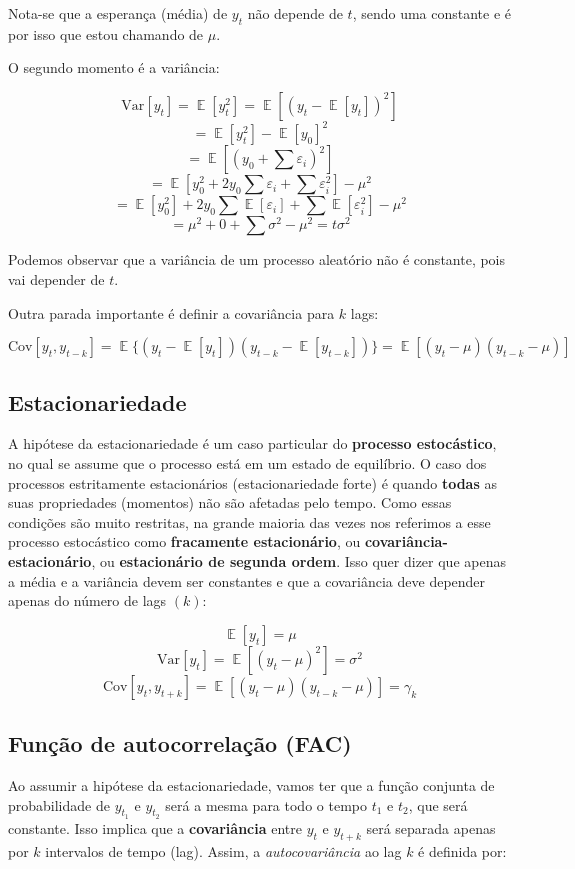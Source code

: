 \documentclass[
  letterpaper,
  DIV=11,
  numbers=noendperiod]{scrreprt}
\DeclareMathOperator{\EX}{\mathbb{E}}
\theoremstyle{definition}
\theoremstyle{plain}
\theoremstyle{remark}
\begin{document}
Nota-se que a esperança (média) de \(y_{t}\) não depende de \(t\), sendo
uma constante e é por isso que estou chamando de \(\mu\).

O segundo momento é a variância:

\[
\text{Var}[y_{t}] = \EX[y_{t}^{2}] = \EX[(y_{t} - \EX[y_{t}])^{2}]
\] \[
= \EX[y_{t}^{2}] - \EX[y_{0}]^{2}
\] \[
= \EX[(y_{0} + \sum \varepsilon_{i})^{2}]
\] \[
= \EX[y_{0}^{2} + 2y_{0}\sum \varepsilon_{i} + \sum \varepsilon_{i}^{2}] - \mu^{2}
\] \[
= \EX[y_{0}^{2}] + 2y_{0}\sum \EX[\varepsilon_{i}] + \sum \EX[\varepsilon_{i}^{2}] - \mu^{2}
\] \[
= \mu^{2} + 0 + \sum \sigma^{2} - \mu^{2} = t \sigma^{2}
\]

Podemos observar que a variância de um processo aleatório não é
constante, pois vai depender de \(t\).

Outra parada importante é definir a covariância para \(k\) lags:

\[
\text{Cov}[y_{t},y_{t-k}] = \EX \{ (y_{t} - \EX[y_{t}])(y_{t-k} - \EX[y_{t-k}]) \} = \EX [(y_{t} - \mu)(y_{t-k} - \mu )]
\]

\subsection{Estacionariedade}\label{estacionariedade}

A hipótese da estacionariedade é um caso particular do \textbf{processo
estocástico}, no qual se assume que o processo está em um estado de
equilíbrio. O caso dos processos estritamente estacionários
(estacionariedade forte) é quando \textbf{todas} as suas propriedades
(momentos) não são afetadas pelo tempo. Como essas condições são muito
restritas, na grande maioria das vezes nos referimos a esse processo
estocástico como \textbf{fracamente estacionário}, ou
\textbf{covariância-estacionário}, ou \textbf{estacionário de segunda
ordem}. Isso quer dizer que apenas a média e a variância devem ser
constantes e que a covariância deve depender apenas do número de lags
\((k)\):

\[
\EX[y_{t}] = \mu
\] \[
\text{Var}[y_{t}] = \EX[(y_{t} - \mu)^{2}] = \sigma^2
\] \[
\text{Cov}[y_{t},y_{t+k}] = \EX [ (y_{t} - \mu)(y_{t-k} - \mu)] = \gamma_{k}
\]

\subsection{Função de autocorrelação
(FAC)}\label{funuxe7uxe3o-de-autocorrelauxe7uxe3o-fac}

Ao assumir a hipótese da estacionariedade, vamos ter que a função
conjunta de probabilidade de \(y_{t_{1}}\) e \(y_{t_{2}}\) será a mesma
para todo o tempo \(t_{1}\) e \(t_{2}\), que será constante. Isso
implica que a \textbf{covariância} entre \(y_{t}\) e \(y_{t+k}\) será
separada apenas por \(k\) intervalos de tempo (lag). Assim, a
\emph{autocovariância} ao lag \(k\) é definida por:
\end{document}
